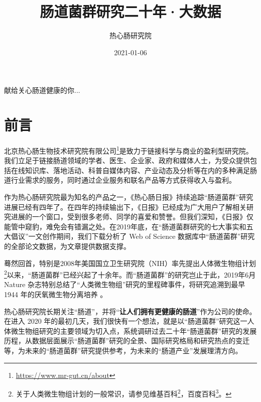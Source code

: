 \documentclass[]{ctexbook}
\title{肠道菌群研究二十年·大数据}
\author{热心肠研究院}
\date{2021-01-06}
\renewcommand{\href}[2]{#2\footnote{\url{#1}}}
\begin{document}
\maketitle


\thispagestyle{empty}

\begin{center}
献给关心肠道健康的你...
\end{center}

\setlength{\abovedisplayskip}{-5pt}
\setlength{\abovedisplayshortskip}{-5pt}

{
\setcounter{tocdepth}{2}
\tableofcontents
}

\hypertarget{ux524dux8a00}{%
\chapter*{前言}\label{ux524dux8a00}}


\href{https://www.mr-gut.cn/about}{北京热心肠生物技术研究院有限公司}是致力于链接科学与商业的盈利型研究院。我们立足于链接肠道领域的学者、医生、企业家、政府和媒体人士，为受众提供包括在线知识库、落地活动、科普自媒体内容、产业动态及分析等在内的多种满足肠道行业需求的服务，同时通过企业服务和联名产品等方式获得收入与盈利。

作为热心肠研究院最为知名的产品之一，《热心肠日报》持续追踪``肠道菌群''研究进展已经有四年了。在四年的持续输出下，《日报》已经成为广大用户了解相关研究进展的一个窗口，受到很多老师、同学的喜爱和赞誉。但我们深知，《日报》仅能管中窥豹，难免会有错漏之处。在2019年底，在``肠道菌群研究的七大事实和五大倡议''一文创作期间，我们下载分析了 Web of Science 数据库中``肠道菌群''研究的全部论文数据，为文章提供数据支撑。

蓦然回首，特别是2008年美国国立卫生研究院（NIH）率先提出人体微生物组计划\footnote{关于人类微生物组计划的一般常识，请参见\href{https://en.wikipedia.org/wiki/Human_Microbiome_Project}{维基百科}，\href{https://baike.baidu.com/item/\%E4\%BA\%BA\%E7\%B1\%BB\%E5\%BE\%AE\%E7\%94\%9F\%E7\%89\%A9\%E7\%BB\%84\%E8\%AE\%A1\%E5\%88\%92/10745945}{百度百科}。}以来，``肠道菌群''已经兴起了十余年。而``肠道菌群''的研究岂止于此，2019年6月 Nature 杂志特别总结了``人类微生物组''研究的里程碑事件，将研究追溯到最早 1944 年的厌氧微生物分离培养 \citep{clarkCulturingAnaerobes2019}。

热心肠研究院长期关注``肠道''，并将``\textbf{让人们拥有更健康的肠道}''作为公司的使命。在进入 2020 年的最初几天，我们很快有一个想法，就是以``肠道菌群''研究这一人体微生物组研究的主要领域为切入点，系统调研过去二十年``肠道菌群''研究的发展历程，从数据层面展示``肠道菌群''研究的全景、国际研究格局和研究热点的变迁等，为未来的``肠道菌群''研究提供参考，为未来的``肠道产业''发展理清方向。
\end{document}
